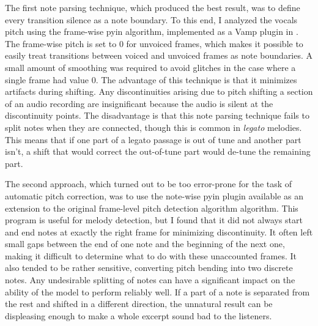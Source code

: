 The first note parsing technique, which produced the best result, was to define every transition silence as a note boundary. To this end, I analyzed the vocals pitch using the frame-wise \gls{pyin} algorithm, implemented as a Vamp plugin in \cite{cannam2010sonic}. The frame-wise pitch is set to 0 for unvoiced frames, which makes it possible to easily treat transitions between voiced and unvoiced frames as note boundaries. A small amount of smoothing was required to avoid glitches in the case where a single frame had value 0. The advantage of this technique is that it minimizes artifacts during shifting. Any discontinuities arising due to pitch shifting a section of an audio recording are insignificant because the audio is silent at the discontinuity points. The disadvantage is that this note parsing technique fails to split notes when they are connected, though this is common in \textit{legato} melodies. This means that if one part of a legato passage is out of tune and another part isn't, a shift that would correct the out-of-tune part would de-tune the remaining part.

The second approach, which turned out to be too error-prone for the task of automatic pitch correction, was to use the note-wise \gls{pyin} plugin available as an extension to the original frame-level pitch detection algorithm algorithm. This program is useful for melody detection, but I found that it did not always start and end notes at exactly the right frame for minimizing discontinuity. It often left small gaps between the end of one note and the beginning of the next one, making it difficult to determine what to do with these unaccounted frames. It also tended to be rather sensitive, converting pitch bending into two discrete notes. Any undesirable splitting of notes can have a significant impact on the ability of the model to perform reliably well. If a part of a note is separated from the rest and shifted in a different direction, the unnatural result can be displeasing enough to make a whole excerpt sound bad to the listeners.

